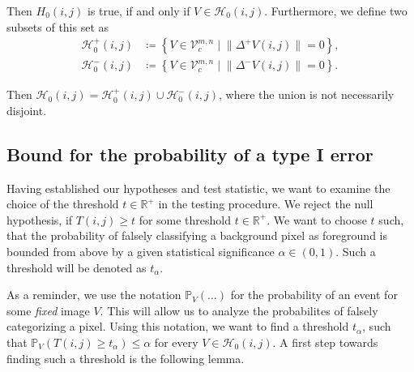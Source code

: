 \documentclass[a4paper,12pt]{article}
\newcommand{\norm}[1]{\lVert#1\rVert}
\theoremstyle{plain}
\theoremstyle{definition}
\begin{document}
Then $H_0(i, j)$ is true, if and only if $V \in \mathcal{H}_0(i, j)$. Furthermore, we define two subsets of this set as
\begin{align}
	\mathcal{H}_0^+(i, j) &\coloneqq \left\{ V \in \mathcal{V}_c^{m, n} \mid \norm{\Delta^+ V(i, j)} = 0 \right\} \label{setH0+}, \\
	\mathcal{H}_0^-(i, j) &\coloneqq \left\{ V \in \mathcal{V}_c^{m, n} \mid \norm{\Delta^- V(i, j)} = 0 \right\} \label{setH0-}.
\end{align}

Then $\mathcal{H}_0(i, j) = \mathcal{H}_0^+(i, j) \cup \mathcal{H}_0^-(i, j)$, where the union is not necessarily disjoint.

\newpage

\subsection{Bound for the probability of a type I error}\label{section: boundtypeIerror}

Having established our hypotheses and test statistic, we want to examine the choice of the threshold $t \in \mathbb{R}^+$ in the testing procedure. We reject the null hypothesis, if $T(i, j) \geq t$ for some threshold $t \in \mathbb{R}^+$. We want to choose $t$ such, that the probability of falsely classifying a background pixel as foreground is bounded from above by a given statistical significance $\alpha \in (0, 1)$. Such a threshold will be denoted as $t_\alpha$.

As a reminder, we use the notation $\mathbb{P}_V( \ldots )$ for the probability of an event for some \emph{fixed} image $V$. This will allow us to analyze the probabilites of falsely categorizing a pixel. Using this notation, we want to find a threshold $t_\alpha$, such that $\mathbb{P}_V( T(i, j) \geq t_\alpha ) \leq \alpha$ for every $V \in \mathcal{H}_0(i, j)$. A first step towards finding such a threshold is the following lemma.
\end{document}
